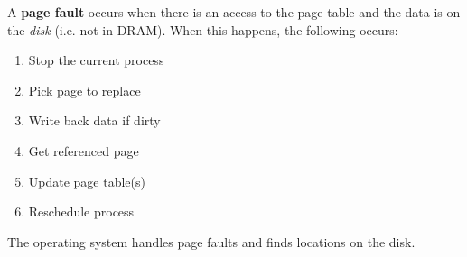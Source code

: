 \begin{definition}
  A \textbf{page fault} occurs when there is an access to the page table and the data is on the \emph{disk} (i.e. not in DRAM). When this happens, the following occurs:
  \begin{enumerate}
    \item Stop the current process
    \item Pick page to replace
    \item Write back data if dirty
    \item Get referenced page
    \item Update page table(s)
    \item Reschedule process
  \end{enumerate}
  \begin{remark}
    The operating system handles page faults and finds locations on the disk.
  \end{remark}
\end{definition}

